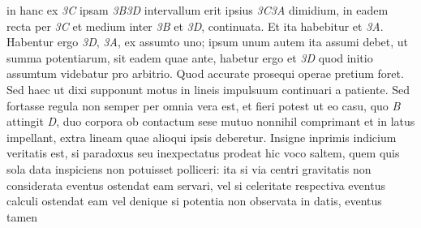 %
%
 in hanc ex \textit{{\scriptsize3}C} ipsam \textit{{\scriptsize3}B{\scriptsize3}D} 
%
%
 intervallum erit ipsius \textit{{\scriptsize3}C{\scriptsize3}A}  
%
dimidium, in eadem recta per \textit{{\scriptsize3}C} et medium inter \textit{{\scriptsize3}B} et \textit{{\scriptsize3}D},  
%
continuata. Et ita habebitur et \textit{{\scriptsize3}A}. Habentur ergo 
%
%
\textit{{\scriptsize3}D}, \textit{{\scriptsize3}A}, ex assumto uno; ipsum unum autem ita assumi debet,  
%
ut summa potentiarum,%
\protect{} sit eadem quae ante, habetur ergo  
%
et \textit{{\scriptsize3}D} quod initio assumtum videbatur pro arbitrio. Quod accurate prosequi operae pretium foret.  
%
Sed haec ut dixi supponunt motus in lineis impulsuum\protect{}%
\protect{} continuari a patiente.  
%
Sed fortasse regula non semper per omnia vera est, et fieri potest ut eo casu,  
%
quo \textit{B} attingit \textit{D}, duo corpora ob contactum\protect{} sese mutuo nonnihil  
%
comprimant et in latus impellant, extra lineam quae alioqui ipsis deberetur. 
\pend 
%
\pstart 
Insigne inprimis indicium veritatis est, si  
%
paradoxus seu inexpectatus prodeat 
%
%
hic voco saltem, quem quis sola data inspiciens non potuisset polliceri: ita si via centri  
%
gravitatis\protect{} non considerata eventus ostendat  
%
eam servari, vel si celeritate respectiva%
\protect{}  
%
%
%
eventus calculi ostendat eam  
%
%
vel denique si %
potentia\protect{} non observata in datis, eventus tamen  
